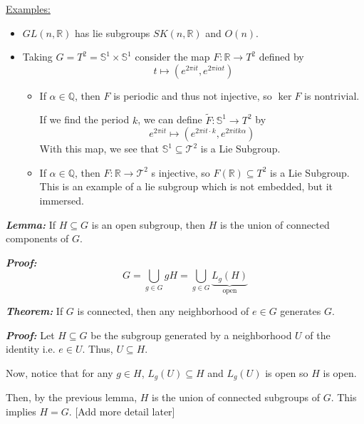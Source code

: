 \documentclass{article}
\newcommand*{\T}{\mathcal T}
\newcommand{\R}{\mathbb{R}}
\begin{document}
\vskip 0.25cm
\underline{Examples:}
\begin{itemize}
  \item $GL(n, \R)$ has lie subgroups $SK(n, \R)$ and $O(n)$.
  \item Taking $G = T^2 = \mathbb{S}^1 \times \mathbb{S}^1$ consider the map $F : \R \rightarrow T^2$ defined by 
  \[ t \mapsto \left(e^{2\pi i t}, e^{2\pi i \alpha t}\right) \]
  \begin{itemize}
    \item If $\alpha \in \mathbb{Q}$, then $F$ is periodic and thus not injective, so $\ker F$ is nontrivial.
    
    \vskip 0.25cm
    If we find the period $k$, we can define $\tilde{F} : \mathbb{S}^1 \rightarrow T^2$ by 
    \[ e^{2\pi i t} \mapsto \left(e^{2\pi i t \cdot k}, e^{2\pi i t k\alpha}\right)  \]
    With this map, we see that $\mathbb{S}^1 \subseteq \T^2$ is a Lie Subgroup.

    \vskip 0.5cm
    \item If $\alpha \in \mathbb{Q}$, then $F : \R \rightarrow \T^2$ s injective, so $F(\R) \subseteq T^2$ is a Lie Subgroup.
    This is an example of a lie subgroup which is not embedded, but it immersed.
  \end{itemize}
\end{itemize}


\begin{dottedbox}
  \emph{\textbf{Lemma:}} If $H \subseteq G$ is an open subgroup, then $H$ is the union of connected components of $G$.
\end{dottedbox}

\emph{\textbf{Proof:}} 
\[ G = \bigcup_{g \in G} gH = \bigcup_{g \in G} \underbrace{L_g(H)} _{\text{open}} \]

\vskip 0.5cm
\begin{dottedbox}
  \emph{\textbf{Theorem:}} If $G$ is connected, then any neighborhood of $e \in G$ generates $G$.
\end{dottedbox}

\emph{\textbf{Proof:}} Let $H \subseteq G$ be the subgroup generated by a neighborhood $U$ of the identity i.e. $e \in U$. Thus, $U \subseteq H$.

\vskip 0.25cm
Now, notice that for any $g \in H$, $L_g(U) \subseteq H$ and $L_g(U)$ is open so $H$ is open.

\vskip 0.25cm
Then, by the previous lemma, $H$ is the union of connected subgroups of $G$. This implies $H = G$. [Add more detail later]
\end{document}

